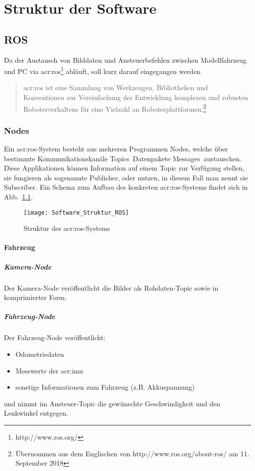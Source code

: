 \chapter{Struktur der Software \dcsecondauthorshort}
\label{cha:software_struktur}

\section{ROS}
Da der Austausch von Bilddaten und Ansteuerbefehlen zwischen Modellfahrzeug und PC via \gls{acr:ros}\footnote{http://www.ros.org/} abläuft, soll kurz darauf eingegangen werden. 
\begin{quotation}
\gls{acr:ros} ist eine Sammlung von Werkzeugen, Bibliotheken und Konventionen zur Vereinfachung der Entwicklung komplexen und robusten Roboterverhaltens für eine Vielzahl an Roboterplattformen.\footnote{Übernommen aus dem Englischen von http://www.ros.org/about-ros/ am 11. September 2018}
\end{quotation}

\subsection{Nodes}
\label{ssec:software_struktur:ros:nodes}
Ein \gls{acr:ros}-System besteht aus mehreren Programmen \glqq Nodes\grqq, welche über bestimmte Kommunikationskanäle \glqq Topics\grqq\ Datenpakete \glqq Messages\grqq\ austauschen. Diese Applikationen können Information auf einem Topic zur Verfügung stellen, sie fungieren als sogenannte Publisher, oder nutzen, in diesem Fall man nennt sie Subscriber. Ein Schema zum Aufbau des konkreten \gls{acr:ros}-Systems findet sich in Abb.~\ref{fig:software_struktur:ros}.

\begin{figure}[H]
	\centering
	\texttt{[image: Software\_Struktur\_ROS]}
	\caption{Struktur des \gls{acr:ros}-Systems}
	\label{fig:software_struktur:ros}
\end{figure}

\subsubsection{Fahrzeug}
\paragraph{Kamera-Node}
Der Kamera-Node veröffentlicht die Bilder als Rohdaten-Topic sowie in komprimierter Form.
\paragraph{Fahrzeug-Node}
Der Fahrzeug-Node veröffentlicht:
\begin{itemize}
\item Odometriedaten 
\item Messwerte der \gls{acr:imu}
\item sonstige Informationen zum Fahrzeug (z.B. Akkuspannung)
\end{itemize}
und nimmt im Ansteuer-Topic die gewünschte Geschwindigkeit und den Lenkwinkel entgegen.
